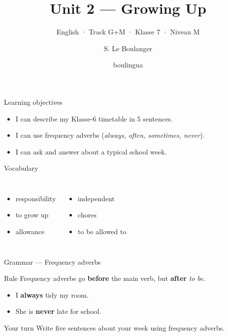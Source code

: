 \documentclass[aspectratio=169,11pt]{beamer}
\title{Unit 2 — Growing Up}
\subtitle{English · Track G+M · Klasse 7 · Niveau M}
\author{S. Le Boulanger}
\date{boulingua}
\begin{document}
\begin{frame}[plain]\titlepage\end{frame}

\begin{frame}{Learning objectives}
  \begin{itemize}
    \item I can describe my Klasse-6 timetable in 5 sentences.
    \item I can use frequency adverbs (\textit{always, often, sometimes, never}).
    \item I can ask and answer about a typical school week.
  \end{itemize}
\end{frame}

\begin{frame}{Vocabulary}
  \begin{columns}[T]
      \begin{itemize}
        \item responsibility
        \item to grow up
        \item allowance
      \end{itemize}
      \begin{itemize}
        \item independent
        \item chores
        \item to be allowed to
      \end{itemize}
  \end{columns}
\end{frame}

\begin{frame}{Grammar — Frequency adverbs}
  \begin{block}{Rule}
    Frequency adverbs go \textbf{before} the main verb, but \textbf{after} \textit{to be}.
  \end{block}
  \begin{itemize}
    \item I \textbf{always} tidy my room.
    \item She is \textbf{never} late for school.
  \end{itemize}
\end{frame}

\begin{frame}{Your turn}
  \Large Write five sentences about your week using frequency adverbs.
\end{frame}
\end{document}
